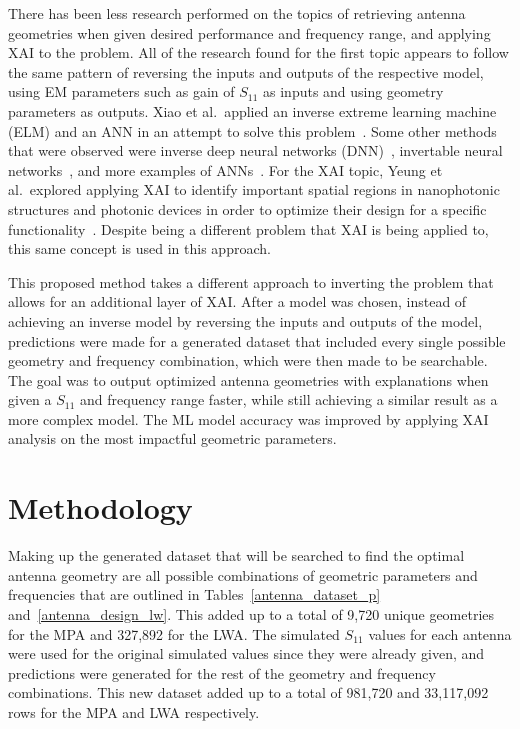 \documentclass[conference]{IEEEtran}
\begin{document}
There has been less research performed on the topics of retrieving antenna geometries when given desired performance and frequency range, and applying XAI to the problem. All of the research found for the first topic appears to follow the same pattern of reversing the inputs and outputs of the respective model, using EM parameters such as gain of $S_{11}$ as inputs and using geometry parameters as outputs. Xiao et al.~applied an inverse extreme learning machine (ELM) and an ANN in an attempt to solve this problem~\cite{9063448,XiaoLi-Ye2021IANN}. Some other methods that were observed were inverse deep neural networks (DNN)~\cite{wu_ai_2024,zhang_inverse_2023}, invertable neural networks~\cite{yu_design_2020}, and more examples of ANNs~\cite{yuan_multibranch_2020}. For the XAI topic, Yeung et al.~explored applying XAI to identify important spatial regions in nanophotonic structures and photonic devices in order to optimize their design for a specific functionality~\cite{YeungChristopher2020EtBo,YeungChristopher2022EAOP}. Despite being a different problem that XAI is being applied to, this same concept is used in this approach. 

This proposed method takes a different approach to inverting the problem that allows for an additional layer of XAI. After a model was chosen, instead of achieving an inverse model by reversing the inputs and outputs of the model, predictions were made for a generated dataset that included every single possible geometry and frequency combination, which were then made to be searchable. The goal was to output optimized antenna geometries with explanations when given a $S_{11}$ and frequency range faster, while still achieving a similar result as a more complex model. The ML model accuracy was improved by applying XAI analysis on the most impactful geometric parameters. 


\section{Methodology}
Making up the generated dataset that will be searched to find the optimal antenna geometry are all possible combinations of geometric parameters and frequencies that are outlined in Tables~\ref{antenna_dataset_p} and~\ref{antenna_design_lw}. This added up to a total of 9,720 unique geometries for the MPA and 327,892 for the LWA. The simulated $S_{11}$ values for each antenna were used for the original simulated values since they were already given, and predictions were generated for the rest of the geometry and frequency combinations. This new dataset added up to a total of 981,720 and 33,117,092 rows for the MPA and LWA respectively.
\end{document}
